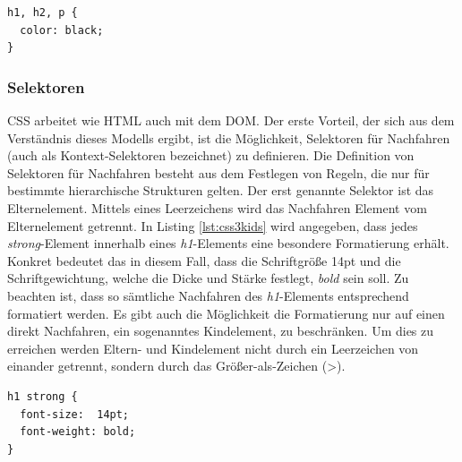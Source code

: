 	\vspace{1em}
	\begin{lstlisting}[frame=htrbl, caption=CSS3 Gruppierung, label=lst:css3group]
h1, h2, p {
  color: black;
}
	\end{lstlisting}

\subsubsection{Selektoren} CSS arbeitet wie HTML auch mit dem DOM. \glqq Der erste Vorteil, der sich aus dem Verständnis dieses Modells ergibt, ist die Möglichkeit, Selektoren für Nachfahren (auch als Kontext-Selektoren bezeichnet) zu definieren. Die Definition von Selektoren für Nachfahren besteht aus dem Festlegen von Regeln, die nur für bestimmte hierarchische Strukturen gelten.\grqq{}\cite[S.48]{MeyeCasc2005} Der erst genannte Selektor ist das Elternelement. Mittels eines Leerzeichens wird das Nachfahren Element vom Elternelement getrennt. In Listing \ref{lst:css3kids} wird angegeben, dass jedes \textit{strong}-Element innerhalb eines \textit{h1}-Elements eine besondere Formatierung erhält. Konkret bedeutet das in diesem Fall, dass die Schriftgröße 14pt und die Schriftgewichtung, welche die Dicke und Stärke festlegt, \textit{bold} sein soll. Zu beachten ist, dass so sämtliche Nachfahren des \textit{h1}-Elements entsprechend formatiert werden. Es gibt auch die Möglichkeit die Formatierung nur auf einen direkt Nachfahren, ein sogenanntes Kindelement, zu beschränken. Um dies zu erreichen werden Eltern- und Kindelement nicht durch ein Leerzeichen von einander getrennt, sondern durch das Größer-als-Zeichen (\textgreater).

	\vspace{1em}
	\begin{lstlisting}[frame=htrbl, caption=CSS3 Selektoren für Nachfahren, label=lst:css3kids]
h1 strong {
  font-size:  14pt;
  font-weight: bold;  
}
	\end{lstlisting}

